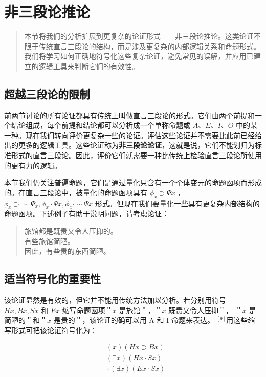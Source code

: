 \section{非三段论推论}

\begin{quotation}
本节将我们的分析扩展到更复杂的论证形式——非三段论推论。这类论证不限于传统直言三段论的结构，而是涉及更复杂的内部逻辑关系和命题形式。我们将学习如何正确地符号化这些复杂论证，避免常见的误解，并应用已建立的逻辑工具来判断它们的有效性。
\end{quotation}

\subsection{超越三段论的限制}

前两节讨论的所有论证都具有传统上叫做直言三段论的形式。它们由两个前提和一个结论组成，每个前提和结论都可以分析成一个单称命题或 $A 、 E 、 I 、 O$ 中的某一种。现在我们转向评价更复杂一些的论证。评估这些论证并不需要比此前已经给出的更多的逻辑工具。这些论证称为\textbf{非三段论论证}，这就是说，它们不能划归为标准形式的直言三段论。因此，评价它们就需要一种比传统上检验直言三段论所使用的更有力的逻辑。

本节我们仍关注普遍命题，它们是通过量化只含有一个个体变元的命题函项而形成的。在直言三段论中，被量化的命题函项具有 $\phi_{x} \supset \Psi x$ ， $\phi_{x} \supset \sim \Psi_{x}, \phi_{x} \cdot \Psi x, \phi_{x} \cdot \sim \Psi x$ 形式。但现在我们要量化一些具有更复杂内部结构的命题函项。下述例子有助于说明问题，请考虑论证：

\begin{quote}
旅馆都是既贵又令人压抑的。\\
有些旅馆简陋。\\
因此，有些贵的东西简陋。
\end{quote}

\subsection{适当符号化的重要性}

该论证显然是有效的，但它并不能用传统方法加以分析。若分别用符号 $H x, B x, S x$ 和 $E x$ 缩写命题函项＂$x$ 是旅馆＂，＂$x$ 既贵又令人压抑＂， ＂$x$ 是简陋的＂和＂$x$ 是贵的＂，该论证的确可以用 A 和 I 命题来表达。 ${ }^{[9]}$用这些缩写形式可把该论证符号化为：

$$
\begin{aligned}
& (x)(H x \supset B x) \\
& (\exists x)(H x \cdot S x) \\
& \therefore(\exists x)(E x \cdot S x)
\end{aligned}
$$

